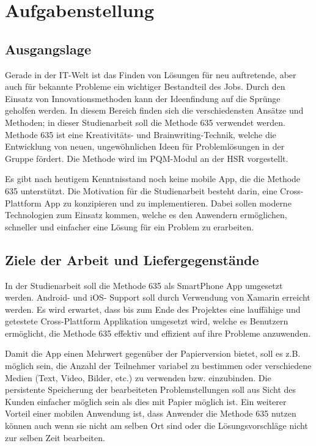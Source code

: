 \section{Aufgabenstellung}
\label{Aufgabenstellung}

\subsection{Ausgangslage}
Gerade in der IT-Welt ist das Finden von Lösungen für neu auftretende, aber auch für bekannte Probleme ein wichtiger Bestandteil des Jobs. Durch den Einsatz von Innovationsmethoden kann der Ideenfindung auf die Sprünge geholfen werden. In diesem Bereich finden sich die verschiedensten Ansätze und Methoden; in dieser Studienarbeit soll die Methode 635 \cite{methode-635} verwendet werden. Methode 635 ist eine Kreativitäts- und Brainwriting-Technik, welche die Entwicklung von neuen, ungewöhnlichen Ideen für Problemlösungen in der Gruppe fördert. Die Methode wird im PQM-Modul an der HSR vorgestellt.
 
Es gibt nach heutigem Kenntnisstand noch keine mobile App, die die Methode 635 unterstützt. Die Motivation für die Studienarbeit besteht darin, eine Cross-Plattform App zu konzipieren und zu implementieren. Dabei sollen moderne Technologien zum Einsatz kommen, welche es den Anwendern ermöglichen, schneller und einfacher eine Lösung für ein Problem zu erarbeiten.

\subsection{Ziele der Arbeit und Liefergegenstände}
In der Studienarbeit soll die Methode 635 als SmartPhone App umgesetzt werden. Android- und iOS- Support soll durch Verwendung von Xamarin erreicht werden.
Es wird erwartet, dass bis zum Ende des Projektes eine lauffähige und getestete Cross-Plattform Applikation umgesetzt wird, welche es Benutzern ermöglicht, die Methode 635 effektiv und effizient auf ihre Probleme anzuwenden. 

Damit die App einen Mehrwert gegenüber der Papierversion bietet, soll es z.B. möglich sein, die Anzahl der Teilnehmer variabel zu bestimmen oder verschiedene Medien (Text, Video, Bilder, etc.) zu verwenden bzw. einzubinden. Die persistente Speicherung der bearbeiteten Problemstellungen soll aus Sicht des Kunden einfacher möglich sein als dies mit Papier möglich ist. Ein weiterer Vorteil einer mobilen Anwendung ist, dass Anwender die Methode 635 nutzen können auch wenn sie nicht am selben Ort sind oder die Lösungsvorschläge nicht zur selben Zeit bearbeiten. 

